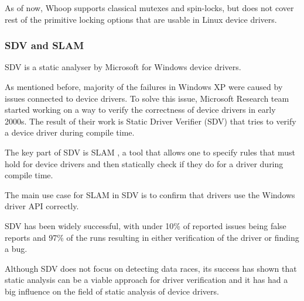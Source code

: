 \documentclass[..thesis.tex]{subfiles}
\begin{document}
As of now, Whoop supports classical mutexes and spin-locks, but does not cover rest of the primitive locking options that are usable in Linux device drivers. 






\subsubsection{SDV and SLAM}

SDV is a static analyser by Microsoft for Windows device drivers.

As mentioned before, majority of the failures in Windows XP were caused by issues connected to device drivers. To solve this issue, Microsoft Research team started working on a way to verify the correctness of device drivers in early 2000s. The result of their work is Static Driver Verifier (SDV) that tries to verify a device driver during compile time. 

The key part of SDV is SLAM \cite{ball_decade_2011}, a tool that allows one to specify rules that must hold for device drivers and then statically check if they do for a driver during compile time. 

The main use case for SLAM in SDV is to confirm that drivers use the Windows driver API correctly.
 
SDV has been widely successful, with under 10\%  of reported issues being false reports \cite[74]{ball_decade_2011} and 97\% of the runs resulting in either verification of the driver or finding a bug.

Although SDV does not focus on detecting data races, its success has shown that static analysis can be a viable approach for driver verification and it has had a big influence on the field of static analysis of device drivers.

\end{document}
